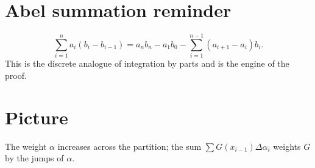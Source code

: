 \documentclass[12pt]{article}
\begin{document}
\section*{Abel summation reminder}
$$
\sum_{i=1}^n a_i (b_i - b_{i-1}) = a_n b_n - a_1 b_0 - \sum_{i=1}^{n-1} (a_{i+1} - a_i) b_i.
$$
This is the discrete analogue of integration by parts and is the engine of the proof.

\section*{Picture}
\begin{center}
\end{center}
The weight $\alpha$ increases across the partition; the sum $\sum G(x_{i-1}) \Delta \alpha_i$ weights $G$ by the jumps of $\alpha$.
\end{document}
